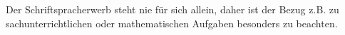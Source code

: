 Der Schriftspracherwerb steht nie für sich allein, daher ist der Bezug z.B. zu sachunterrichtlichen oder mathematischen Aufgaben besonders zu beachten.
